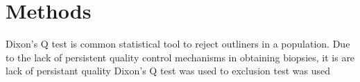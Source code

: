 \chapter{Methods}

Dixon's Q test is common statistical tool to reject outliners in a population. Due to the lack of persistent quality control mechanisms in obtaining biopsies, it is are lack of persistant quality Dixon's Q test was used to   exclusion test was used 